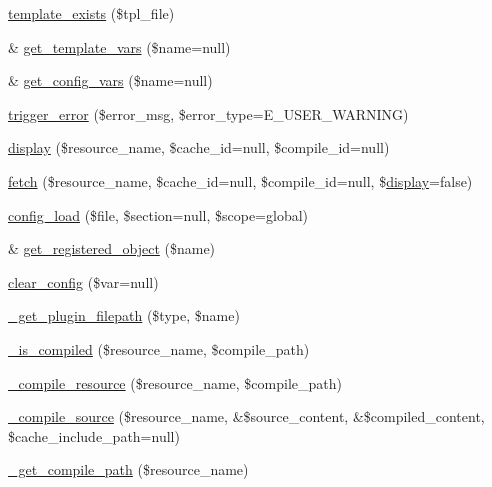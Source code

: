 \begin{DoxyCompactItemize}
\item 
\mbox{\hyperlink{class_smarty_abfade212562dbeff89ccf453c02f5a1b}{template\+\_\+exists}} (\$tpl\+\_\+file)
\item 
\& \mbox{\hyperlink{class_smarty_a0c15a4f13f37eaca8a6e8ed91ad77b23}{get\+\_\+template\+\_\+vars}} (\$name=null)
\item 
\& \mbox{\hyperlink{class_smarty_a2382294d36d8e557c475d66350844bfb}{get\+\_\+config\+\_\+vars}} (\$name=null)
\item 
\mbox{\hyperlink{class_smarty_aa4f8246510406271300bee84f9e1bce3}{trigger\+\_\+error}} (\$error\+\_\+msg, \$error\+\_\+type=E\+\_\+\+U\+S\+E\+R\+\_\+\+W\+A\+R\+N\+I\+NG)
\item 
\mbox{\hyperlink{class_smarty_a7318c22504478672906d321cba2bd713}{display}} (\$resource\+\_\+name, \$cache\+\_\+id=null, \$compile\+\_\+id=null)
\item 
\mbox{\hyperlink{class_smarty_acd45e8177ae9f297026ee9a0732e976c}{fetch}} (\$resource\+\_\+name, \$cache\+\_\+id=null, \$compile\+\_\+id=null, \$\mbox{\hyperlink{class_smarty_a7318c22504478672906d321cba2bd713}{display}}=false)
\item 
\mbox{\hyperlink{class_smarty_af8b4afb25666f433974aedae9dbd5d1e}{config\+\_\+load}} (\$file, \$section=null, \$scope=\textquotesingle{}global\textquotesingle{})
\item 
\& \mbox{\hyperlink{class_smarty_ae922fb129fc263df7c3f4b83880b199d}{get\+\_\+registered\+\_\+object}} (\$name)
\item 
\mbox{\hyperlink{class_smarty_a889e401c09b8d2612e43a50cb2a7dc04}{clear\+\_\+config}} (\$var=null)
\item 
\mbox{\hyperlink{class_smarty_aca3dac6a8fa20f5038e34af0c7f1c78b}{\+\_\+get\+\_\+plugin\+\_\+filepath}} (\$type, \$name)
\item 
\mbox{\hyperlink{class_smarty_a315bf9a64ca2baea77f8868804d847be}{\+\_\+is\+\_\+compiled}} (\$resource\+\_\+name, \$compile\+\_\+path)
\item 
\mbox{\hyperlink{class_smarty_af0c22913faf4ec5e6d8674c643c69cc5}{\+\_\+compile\+\_\+resource}} (\$resource\+\_\+name, \$compile\+\_\+path)
\item 
\mbox{\hyperlink{class_smarty_a9df9b14069c359f1f45416acc6d7d81f}{\+\_\+compile\+\_\+source}} (\$resource\+\_\+name, \&\$source\+\_\+content, \&\$compiled\+\_\+content, \$cache\+\_\+include\+\_\+path=null)
\item 
\mbox{\hyperlink{class_smarty_a8a89232edb42318063b90fee5f608ec0}{\+\_\+get\+\_\+compile\+\_\+path}} (\$resource\+\_\+name)

\end{DoxyCompactItemize}
